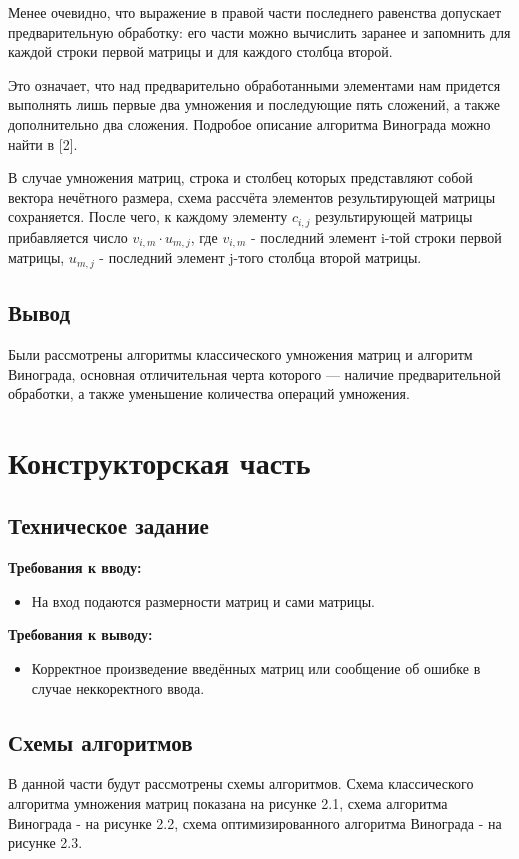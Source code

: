 \documentclass[12pt]{report}
\begin{document}
Менее очевидно, что выражение в правой части последнего равенства допускает предварительную обработку: его части можно вычислить заранее и запомнить для каждой строки первой матрицы и для каждого столбца второй. 

Это означает, что над предварительно обработанными элементами нам придется выполнять лишь первые два умножения и последующие пять сложений, а также дополнительно два сложения. Подробое описание алгоритма Винограда можно найти в [2].

В случае умножения матриц, строка и столбец которых представляют собой вектора нечётного размера, схема рассчёта элементов результирующей матрицы сохраняется. После чего, к каждому элементу $c_{i,j}$ результирующей матрицы прибавляется число $v_{i, m} \cdot u_{m, j}$, где $v_{i, m}$ - последний элемент i-той строки первой матрицы, $u_{m, j}$ - последний элемент j-того столбца второй матрицы.

\section{Вывод}
Были рассмотрены алгоритмы классического умножения матриц и алгоритм Винограда, основная отличительная черта которого — наличие предварительной обработки, а также уменьшение количества операций умножения.


\chapter{Конструкторская часть}
\section{Техническое задание}
\textbf{Требования к вводу:}\\
\begin{itemize}
	\item На вход подаются размерности матриц и сами матрицы.
\end{itemize}

\textbf{Требования к выводу:}\\
\begin{itemize}
	\item Корректное произведение введённых матриц или сообщение об ошибке в случае неккоректного ввода.
\end{itemize}


\section{Схемы алгоритмов}
В данной части будут рассмотрены схемы алгоритмов. Схема классического алгоритма умножения матриц показана на рисунке 2.1, схема алгоритма Винограда - на рисунке 2.2, схема оптимизированного алгоритма Винограда - на рисунке 2.3.
\end{document}
